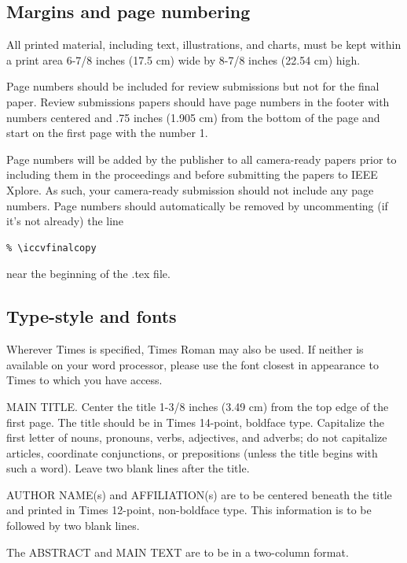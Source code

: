 \documentclass[10pt,twocolumn,letterpaper]{article}
\begin{document}
\subsection{Margins and page numbering}

All printed material, including text, illustrations, and charts, must be kept
within a print area 6-7/8 inches (17.5 cm) wide by 8-7/8 inches (22.54 cm)
high.

Page numbers should be included for review submissions but not for the 
final paper. Review submissions papers should have page numbers in the 
footer with numbers centered and .75 inches (1.905 cm) from the bottom 
of the page and start on the first page with the number 1.

Page numbers will be added by the publisher to all camera-ready papers 
prior to including them in the proceedings and before submitting the 
papers to IEEE Xplore. As such, your camera-ready submission should 
not include any page numbers. Page numbers should automatically be 
removed by uncommenting (if it's not already) the line
\begin{verbatim}
% \iccvfinalcopy
\end{verbatim}
near the beginning of the .tex file.

\subsection{Type-style and fonts}

Wherever Times is specified, Times Roman may also be used. If neither is
available on your word processor, please use the font closest in
appearance to Times to which you have access.

MAIN TITLE. Center the title 1-3/8 inches (3.49 cm) from the top edge of
the first page. The title should be in Times 14-point, boldface type.
Capitalize the first letter of nouns, pronouns, verbs, adjectives, and
adverbs; do not capitalize articles, coordinate conjunctions, or
prepositions (unless the title begins with such a word). Leave two blank
lines after the title.

AUTHOR NAME(s) and AFFILIATION(s) are to be centered beneath the title
and printed in Times 12-point, non-boldface type. This information is to
be followed by two blank lines.

The ABSTRACT and MAIN TEXT are to be in a two-column format.
\end{document}

